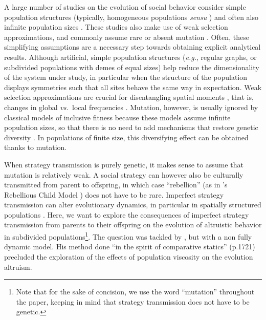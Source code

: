 \documentclass[11pt, letterpaper]{article}
\newcommand{\eg}{\textit{e.g.}}
\newcommand{\vs}{\textit{vs.\ }}
\begin{document}
A large number of studies on the evolution of social behavior consider simple population structures (typically, homogeneous populations \textit{sensu} \citet[][]{TaylorDayWild2007}) and often also infinite population sizes \citep[but see][for results on any structure]{Allen2017}. 
These studies also make use of weak selection approximations, and commonly assume rare \citep[\eg,][]{LeturqueRousset2002, Taylor2007JTB, TarnitaTaylor2014} or absent mutation \citep[for models assuming infinite population sizes, or models concentrating on fixation probabilities; see][for recent reviews]{LehmannRousset2014,VanCleve2015}. 
Often, these simplifying assumptions are a necessary step towards obtaining explicit analytical results. 
Although artificial, simple population structures (\eg, regular graphs, or subdivided populations with demes of equal sizes) help reduce the dimensionality of the system under study, in particular when the structure of the population displays symmetries such that all sites behave the same way in expectation. 
Weak selection approximations are crucial for disentangling spatial moments \citep{Lion2016}, that is, changes in global \vs local frequencies \citep[though they can in some cases be relaxed, as in][]{MullonLehmann2014}. 
Mutation, however, is usually ignored by classical models of inclusive fitness because these models assume infinite population sizes, so that there is no need to add mechanisms that restore genetic diversity \citep{TarnitaTaylor2014}. In populations of finite size,  this diversifying effect can be obtained thanks to mutation. %

When strategy transmission is purely genetic, it makes sense to assume that mutation is relatively weak. A social strategy can however also be culturally transmitted from parent to offspring, in which case ``rebellion'' (as in \citeauthor{Frank1997}'s Rebellious Child Model \citep{Frank1997}) does not have to be rare. Imperfect strategy transmission can alter evolutionary dynamics, in particular in spatially structured populations \citep[see \eg,][for graph-structured populations]{Allen2012,Debarre2017}. Here, we want to explore the consequences of imperfect strategy transmission from parents to their offspring on the evolution of altruistic behavior in subdivided populations\footnote{Note that for the sake of concision, we use the word ``mutation'' throughout the paper, keeping in mind that strategy transmission does not have to be genetic. }. The question was tackled by \citet{Frank1997}, but with a non fully dynamic model. His method done ``in the spirit of comparative statics'' (p.1721) precluded the exploration of the effects of population viscosity on the evolution altruism. 
\end{document}
